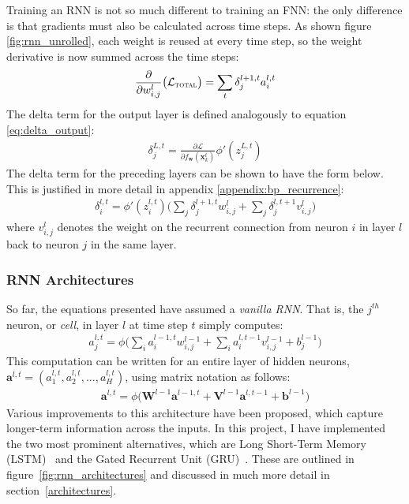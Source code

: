\documentclass[a4paper, 12pt]{report}
\newcommand{\tit}[1]{\textit{#1}}
\begin{document}
Training an RNN is not so much different to training an FNN: the only difference is that gradients must also be calculated across time steps. As shown figure \ref{fig:rnn_unrolled}, each weight is reused at every time step, so the weight derivative is now summed across the time steps:
\begin{gather}
	\frac{\partial}{\partial w_{i,j}^l} \big( \mathcal{L}_{\text{\scshape total}} \big) = \sum_t \delta_j^{l+1,t} a_i^{l,t}
\end{gather}
The delta term for the output layer is defined analogously to equation \ref{eq:delta_output}:
\begin{gather} \label{eq:delta_output_rnn}
	\delta_j^{L,t} = \frac{\partial \mathcal{L}}{\partial f_{\mathbf{w}}(\mathbf{x}_k^t)} \phi'(z_j^{L,t})
\end{gather}
The delta term for the preceding layers can be shown to have the form below. This is justified in more detail in appendix \ref{appendix:bp_recurrence}:
\begin{gather} \label{eq:delta_hidden_rnn}
	\delta_i^{l,t} = \phi'(z_i^{l,t}) \big( \sum_j \delta_j^{l+1,t} w_{i,j}^l + \sum_j \delta_j^{l,t+1} v_{i,j}^l \big)
\end{gather}
where $v_{i,j}^l$ denotes the weight on the recurrent connection from neuron $i$ in layer $l$ back to neuron $j$ in the same layer.

\subsubsection{RNN Architectures}
So far, the equations presented have assumed a \tit{vanilla RNN}. That is, the $j^{th}$ neuron, or \tit{cell}, in layer $l$ at time step $t$ simply computes:
\begin{gather}
	a_j^{l, t} = \phi \big( \sum_i a_i^{l - 1, t} w_{i,j}^{l-1} + \sum_i a_i^{l, t - 1} v_{i,j}^{l-1} + b^{l - 1}_j \big)
\end{gather}
This computation can be written for an entire layer of hidden neurons, $\mathbf{a}^{l, t} = (a_1^{l, t}, a_2^{l, t}, ..., a_H^{l, t})$, using matrix notation as follows:
\begin{gather} \label{eq:vanilla_rnn}
	\mathbf{a}^{l, t} = \phi \big( \mathbf{W}^{l - 1} \mathbf{a}^{l - 1, t} + \mathbf{V}^{l - 1} \mathbf{a}^{l, t - 1} + \mathbf{b}^{l - 1} \big)
\end{gather}
Various improvements to this architecture have been proposed, which capture longer-term information across the inputs. In this project, I have implemented the two most prominent alternatives, which are Long Short-Term Memory (LSTM)~\cite{lstm:hochreiter1997} and the Gated Recurrent Unit (GRU)~\cite{gru:cho2014}. These are outlined in figure~\ref{fig:rnn_architectures} and discussed in much more detail in section~\ref{architectures}. \\
\end{document}
